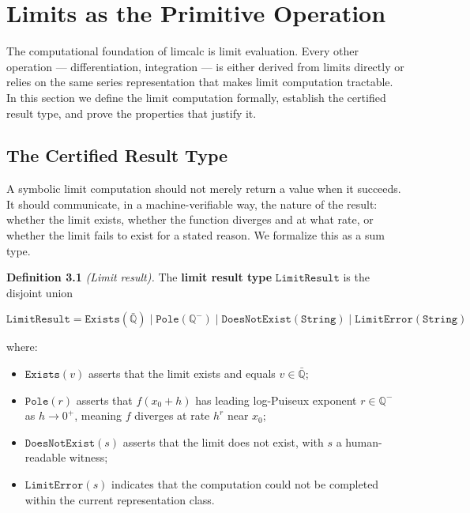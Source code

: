 \documentclass[12pt]{article}
\providecommand{\tightlist}{\setlength{\itemsep}{0pt}\setlength{\parskip}{0pt}}
\begin{document}
\section{Limits as the Primitive
Operation}\label{limits-as-the-primitive-operation}

The computational foundation of limcalc is limit evaluation. Every other
operation --- differentiation, integration --- is either derived from
limits directly or relies on the same series representation that makes
limit computation tractable. In this section we define the limit
computation formally, establish the certified result type, and prove the
properties that justify it.


\subsection{The Certified Result
Type}\label{the-certified-result-type}

A symbolic limit computation should not merely return a value when it
succeeds. It should communicate, in a machine-verifiable way, the nature
of the result: whether the limit exists, whether the function diverges
and at what rate, or whether the limit fails to exist for a stated
reason. We formalize this as a sum type.

\textbf{Definition 3.1} \emph{(Limit result).} The \textbf{limit result
type} \(\mathtt{LimitResult}\) is the disjoint union

\[\mathtt{LimitResult} = \mathtt{Exists}(\bar{\mathbb{Q}}) \mid \mathtt{Pole}(\mathbb{Q}^-) \mid \mathtt{DoesNotExist}(\mathtt{String}) \mid \mathtt{LimitError}(\mathtt{String})\]

where:

\begin{itemize}
\tightlist
\item
  \(\mathtt{Exists}(v)\) asserts that the limit exists and equals
  \(v \in \bar{\mathbb{Q}}\);
\item
  \(\mathtt{Pole}(r)\) asserts that \(f(x_0 + h)\) has leading
  log-Puiseux exponent \(r \in \mathbb{Q}^-\) as \(h \to 0^+\), meaning
  \(f\) diverges at rate \(h^r\) near \(x_0\);
\item
  \(\mathtt{DoesNotExist}(s)\) asserts that the limit does not exist,
  with \(s\) a human-readable witness;
\item
  \(\mathtt{LimitError}(s)\) indicates that the computation could not be
  completed within the current representation class.
\end{itemize}
\end{document}
